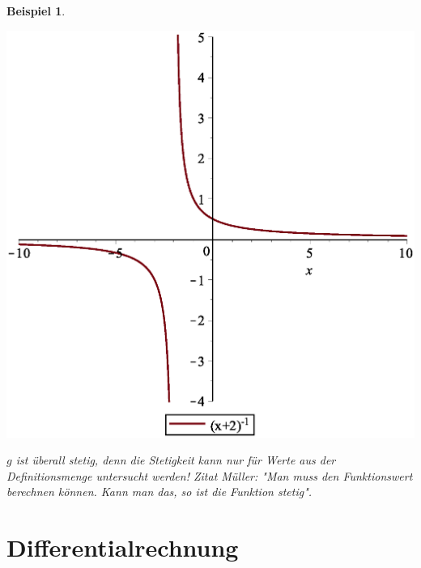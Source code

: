 \documentclass{report}
\newtheorem{myexample}{Beispiel}
\begin{document}
\begin{myexample}
\begin{enumerate}
\begin{center}\includegraphics[scale=0.2]{images/limes_1_x-2.eps}\end{center}
$g$ ist überall stetig, denn die Stetigkeit kann nur für Werte aus der Definitionsmenge untersucht werden! Zitat Müller: "Man muss den Funktionswert berechnen können. Kann man das, so ist die Funktion stetig".
\end{enumerate}
\end{myexample}

\chapter{Differentialrechnung}
\end{document}
